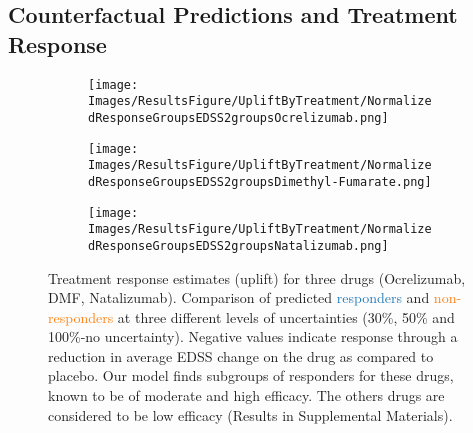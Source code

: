 \documentclass[runningheads]{llncs}
\newcommand{\blue}{\textcolor[HTML]{1f77b4}}
\newcommand{\orange}{\textcolor[HTML]{ff7f0e}}
\begin{document}
\subsection{Counterfactual Predictions and Treatment Response}
\label{sec:CDP}
\begin{figure}

    \begin{subfigure}{0.33\textwidth}
            \texttt{[image: Images/ResultsFigure/UpliftByTreatment/NormalizedResponseGroupsEDSS2groupsOcrelizumab.png]}   
            \caption{} 
            \label{fig:ResponseGroupsA}
  \end{subfigure}\hfil
    \begin{subfigure}{0.33\textwidth}
            \texttt{[image: Images/ResultsFigure/UpliftByTreatment/NormalizedResponseGroupsEDSS2groupsDimethyl-Fumarate.png]}   
            \caption{} 
            \label{fig:ResponseGroupsB}
  \end{subfigure}\hfil
      \begin{subfigure}{0.33\textwidth}
            \texttt{[image: Images/ResultsFigure/UpliftByTreatment/NormalizedResponseGroupsEDSS2groupsNatalizumab.png]}   
            \caption{} 
            \label{fig:ResponseGroupsC}
  \end{subfigure}\hfil
    \caption{Treatment response estimates (uplift) for three drugs (Ocrelizumab, DMF, Natalizumab). Comparison of predicted \blue{responders} and \orange{non-responders} at three different levels of uncertainties (30\%, 50\% and 100\%-no uncertainty). Negative values indicate response through a reduction in average EDSS change on the drug as compared to placebo.  Our model finds subgroups of responders for these drugs, known to be of moderate and high efficacy. The others drugs are considered to be low efficacy (Results in Supplemental Materials).}
    \label{fig:ResponseGroups}
\end{figure}
\end{document}
